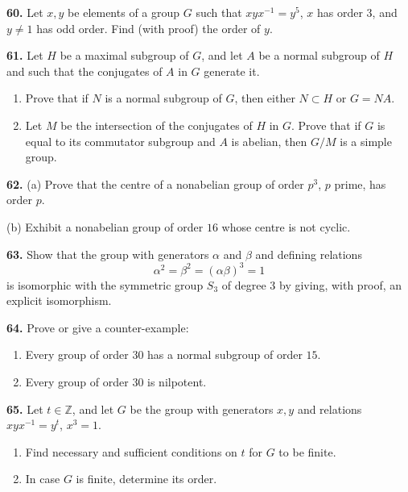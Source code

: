 \documentclass[a4paper,11pt,final,openany]{memoir}%
\theoremstyle{nonumberplain}
\begin{document}
\medskip\noindent\textbf{60.} Let $x,y$ be elements of a group $G$ such that
$xyx^{-1}=y^{5}$, $x$ has order $3$, and $y\neq1$ has odd order. Find (with
proof) the order of $y$.

\medskip\noindent\textbf{61.} Let $H$ be a maximal subgroup of $G$, and let
$A$ be a normal subgroup of $H$ and such that the conjugates of $A$ in $G$
generate it.

\begin{enumerate}
\item Prove that if $N$ is a normal subgroup of $G$, then either $N\subset H$
or $G=NA$.

\item Let $M$ be the intersection of the conjugates of $H$ in $G$. Prove that
if $G$ is equal to its commutator subgroup and $A$ is abelian, then $G/M $ is
a simple group.
\end{enumerate}

\medskip\noindent\textbf{62.} (a) Prove that the centre of a nonabelian group
of order $p^{3}$, $p$ prime, has order $p$.

\noindent(b) Exhibit a nonabelian group of order $16$ whose centre is not cyclic.

\medskip\noindent\textbf{63.} Show that the group with generators $\alpha$ and
$\beta$ and defining relations
\[
\alpha^{2}=\beta^{2}=(\alpha\beta)^{3}=1
\]
is isomorphic with the symmetric group $S_{3}$ of degree $3$ by giving, with
proof, an explicit isomorphism.

\medskip\noindent\textbf{64.} Prove or give a counter-example:

\begin{enumerate}
\item Every group of order $30$ has a normal subgroup of order $15$.

\item Every group of order $30$ is nilpotent.
\end{enumerate}

\medskip\noindent\textbf{65.} Let $t\in\mathbb{Z}$, and let $G$ be the group
with generators $x,y$ and relations $xyx^{-1}=y^{t}$, $x^{3}=1$.

\begin{enumerate}
\item Find necessary and sufficient conditions on $t$ for $G$ to be finite.

\item In case $G$ is finite, determine its order.
\end{enumerate}
\end{document}
